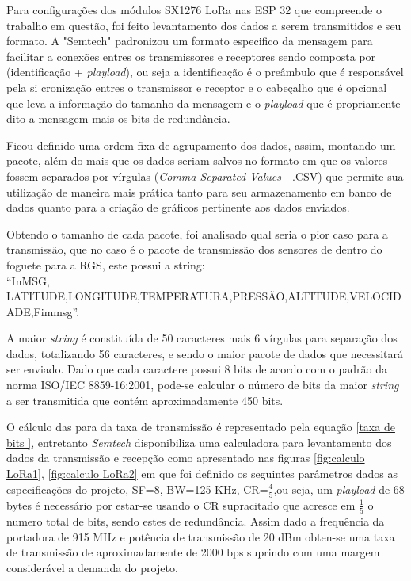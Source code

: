 \par Para configurações dos módulos SX1276 LoRa nas ESP 32 que compreende o trabalho em questão, foi feito levantamento dos dados a serem transmitidos e seu formato. A "Semtech" padronizou um formato especifico da mensagem para facilitar a conexões entres os transmissores e receptores sendo composta por (identificação + \textit{playload}), ou seja a identificação é o preâmbulo que é responsável pela si cronização entres o transmissor e receptor e o cabeçalho que é opcional que leva a informação do tamanho da mensagem e o \textit{playload} que é propriamente dito a mensagem mais os bits de redundância\cite{loras}.      
\par Ficou definido uma ordem fixa de agrupamento dos dados, assim, montando um pacote, além do mais que os dados seriam salvos  no formato em que os valores fossem separados por vírgulas (\textit{Comma Separated Values} - .CSV) que permite sua utilização de maneira mais prática tanto para seu armazenamento em banco de dados quanto para a criação de gráficos pertinente aos dados enviados.
\par Obtendo o tamanho de cada pacote, foi  analisado qual seria o pior caso para a transmissão, que no caso  é o pacote  de transmissão dos sensores de dentro do foguete para a RGS, este possui a string:\\
{ \footnotesize “InMSG, LATITUDE,LONGITUDE,TEMPERATURA,PRESSÃO,ALTITUDE,VELOCIDADE,Fimmsg”.}
\par A maior \textit{string} é constituída de 50 caracteres mais 6 vírgulas para separação dos dados, totalizando 56 caracteres, e sendo o maior pacote de dados que necessitará ser enviado. Dado que cada caractere possui 8 bits de acordo com o padrão da norma ISO/IEC 8859-16:2001, pode-se calcular o número de bits da maior \textit{string} a ser transmitida que contém aproximadamente 450 bits.

\par O cálculo das  para da taxa de transmissão é representado pela equação \ref{taxa de bits }, entretanto  \textit{Semtech} disponibiliza uma calculadora para levantamento dos dados da transmissão e recepção como apresentado nas figuras \ref{fig:calculo LoRa1}, \ref{fig:calculo LoRa2} em que foi definido os seguintes parâmetros dados as especificações do projeto, SF=8, BW=125 KHz, CR=$ \frac{4}{5}$,ou seja, um \textit{playload} de 68 bytes é necessário por estar-se usando o CR supracitado que acresce em $\frac{1}{5}$ o numero total de bits, sendo estes de redundância. Assim dado a frequência da portadora de 915 MHz e potência de transmissão de 20 dBm   obten-se uma taxa de transmissão de aproximadamente de 2000 bps suprindo com uma margem considerável  a demanda do projeto. 


